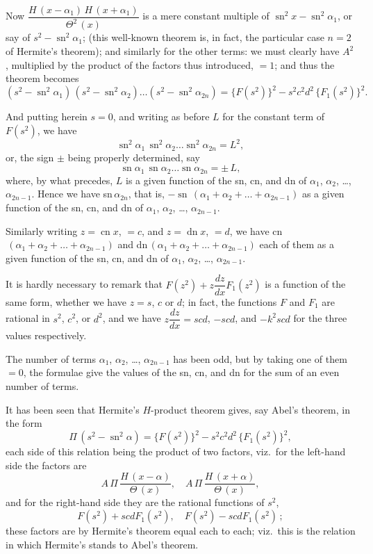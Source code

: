 \documentclass[11pt,a4paper]{article}
\theoremstyle{plain}
\theoremstyle{definition}
\begin{document}
Now $\dfrac{H\,(x-\alpha_1)\, H\,(x+\alpha_1)}{\Theta^2\,(x)}$ is a mere constant multiple of $\operatorname{sn}^2 x - \operatorname{sn}^2 \alpha_1$, or say of $s^2 - \operatorname{sn}^2 \alpha_1$; (this well-known theorem is, in fact, the particular case $n=2$ of Hermite's theorem); and similarly for the other terms: we must clearly have $A^2$, multiplied by the product of the factors thus introduced, $=1$; and thus the theorem becomes
\[ (s^2 - \operatorname{sn}^2 \alpha_1)\, (s^2 - \operatorname{sn}^2 \alpha_2) \ldots (s^2 - \operatorname{sn}^2 \alpha_{2n}) = \{F(s^2)\}^2 - s^2 c^2 d^2\, \{F_1(s^2)\}^2. \]

And putting herein $s=0$, and writing as before $L$ for the constant term of $F(s^2)$, we have
\[ \operatorname{sn}^2 \alpha_1 \, \operatorname{sn}^2 \alpha_2 \ldots \operatorname{sn}^2 \alpha_{2n} = L^2, \]
or, the sign $\pm$ being properly determined, say
\[ \operatorname{sn} \alpha_1 \, \operatorname{sn} \alpha_2 \ldots \operatorname{sn} \alpha_{2n} = \pm\, L, \]
where, by what precedes, $L$ is a given function of the sn, cn, and dn of $\alpha_1$, $\alpha_2$, \ldots, $\alpha_{2n-1}$. Hence we have sn$\,\alpha_{2n}$, that is, $-\operatorname{sn}\,(\alpha_1 + \alpha_2 + \ldots + \alpha_{2n-1})$ as a given function of the sn, cn, and dn of $\alpha_1$, $\alpha_2$, \ldots, $\alpha_{2n-1}$.

Similarly writing $z = \operatorname{cn} x$, $=c$, and $z = \operatorname{dn} x$, $=d$, we have cn$\,(\alpha_1 + \alpha_2 + \ldots + \alpha_{2n-1})$ and dn$\,(\alpha_1 + \alpha_2 + \ldots + \alpha_{2n-1})$ each of them as a given function of the sn, cn, and dn of $\alpha_1$, $\alpha_2$, \ldots, $\alpha_{2n-1}$.

It is hardly necessary to remark that $F(z^2) + z\dfrac{dz}{dx}F_1(z^2)$ is a function of the same form, whether we have $z=s$, $c$ or $d$; in fact, the functions $F$ and $F_1$ are rational in $s^2$, $c^2$, or $d^2$, and we have $z\dfrac{dz}{dx} = scd$, $-scd$, and $-k^2 scd$ for the three values respectively.

The number of terms $\alpha_1$, $\alpha_2$, \ldots, $\alpha_{2n-1}$ has been odd, but by taking one of them $=0$, the formulae give the values of the sn, cn, and dn for the sum of an even number of terms.

It has been seen that Hermite's $H$-product theorem gives, say Abel's theorem, in the form
\[ \Pi\, (s^2 - \operatorname{sn}^2 \alpha) = \{F(s^2)\}^2 - s^2 c^2 d^2\, \{F_1(s^2)\}^2, \]
each side of this relation being the product of two factors, viz.\ for the left-hand side the factors are
\[ A\,\Pi\, \frac{H\,(x-\alpha)}{\Theta\,(x)},\quad A\,\Pi\, \frac{H\,(x+\alpha)}{\Theta\,(x)}, \]
and for the right-hand side they are the rational functions of $s^2$,
\[ F(s^2) + scdF_1(s^2),\quad F(s^2) - scdF_1(s^2)\,; \]
these factors are by Hermite's theorem equal each to each; viz.\ this is the relation in which Hermite's stands to Abel's theorem.
\end{document}
